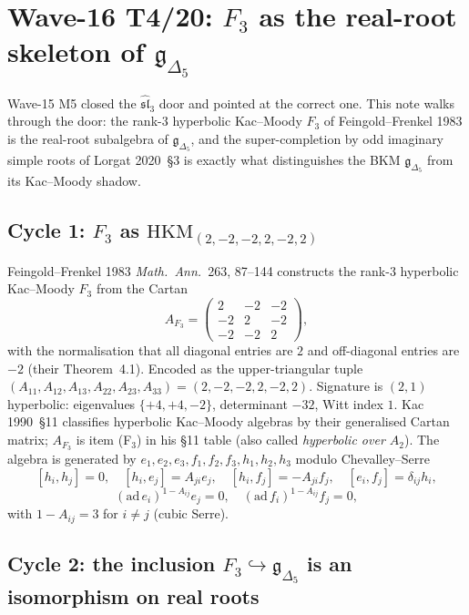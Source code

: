 \documentclass[12pt]{article}
\providecommand{\gDelta}{\mathfrak{g}_{\Delta_5}}
\providecommand{\FF}{F_3}
\providecommand{\slhat}[1]{\widehat{\mathfrak{sl}}_{#1}}
\providecommand{\HKM}{\mathrm{HKM}}
\begin{document}
\section*{Wave-16 T4/20: $F_3$ as the real-root skeleton of $\gDelta$}

Wave-15 M5 closed the $\slhat{3}$ door and pointed at the correct
one. This note walks through the door: the rank-$3$ hyperbolic
Kac--Moody $F_3$ of Feingold--Frenkel 1983 is the real-root
subalgebra of $\gDelta$, and the super-completion by odd imaginary
simple roots of Lorgat 2020~\S 3 is exactly what distinguishes the
BKM $\gDelta$ from its Kac--Moody shadow.

\subsection*{Cycle 1: $F_3$ as $\HKM_{(2,-2,-2,2,-2,2)}$}

Feingold--Frenkel 1983 \emph{Math.\ Ann.}~263, 87--144 constructs
the rank-$3$ hyperbolic Kac--Moody $\FF$ from the Cartan
\[
  A_{\FF} = \begin{pmatrix} 2 & -2 & -2 \\ -2 & 2 & -2 \\ -2 & -2 & 2 \end{pmatrix},
\]
with the normalisation that all diagonal entries are $2$ and
off-diagonal entries are $-2$ (their Theorem~4.1). Encoded as the
upper-triangular tuple $(A_{11},A_{12},A_{13},A_{22},A_{23},A_{33})
= (2,-2,-2,2,-2,2)$. Signature is $(2,1)$ hyperbolic: eigenvalues
$\{+4,+4,-2\}$, determinant $-32$, Witt index $1$. Kac 1990~\S 11
classifies hyperbolic Kac--Moody algebras by their generalised
Cartan matrix; $A_{\FF}$ is item (F$_3$) in his \S 11 table (also
called \emph{hyperbolic over $A_2$}). The algebra is generated by
$e_1,e_2,e_3,f_1,f_2,f_3,h_1,h_2,h_3$ modulo Chevalley--Serre
\[
  [h_i,h_j]=0,\quad [h_i,e_j]=A_{ji}e_j,\quad [h_i,f_j]=-A_{ji}f_j,
  \quad [e_i,f_j]=\delta_{ij}h_i,
\]
\[
  (\mathrm{ad}\,e_i)^{1-A_{ij}}e_j = 0,\quad (\mathrm{ad}\,f_i)^{1-A_{ij}}f_j = 0,
\]
with $1 - A_{ij} = 3$ for $i \neq j$ (cubic Serre).

\subsection*{Cycle 2: the inclusion $\FF \hookrightarrow \gDelta$ is an isomorphism on real roots}
\end{document}
